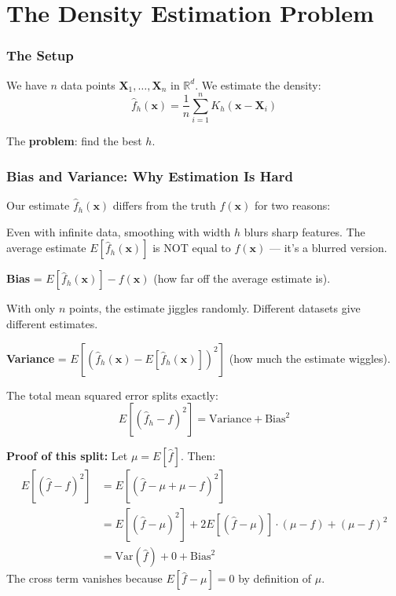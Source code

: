 \documentclass[12pt]{article}
\newcommand{\concept}[2]{\begin{tcolorbox}[colback=blue!3,colframe=blue!40!black,title={#1},breakable]#2\end{tcolorbox}}
\newcommand{\mathnote}[1]{\begin{tcolorbox}[colback=yellow!5,colframe=yellow!60!black,breakable]#1\end{tcolorbox}}
\begin{document}
\part{The Density Estimation Problem}

\section{The Setup}

We have $n$ data points $\mathbf{X}_1, \ldots, \mathbf{X}_n$ in $\mathbb{R}^d$. We estimate the density:
$$\hat{f}_h(\mathbf{x}) = \frac{1}{n}\sum_{i=1}^n K_h(\mathbf{x} - \mathbf{X}_i)$$

The \textbf{problem}: find the best $h$.

\section{Bias and Variance: Why Estimation Is Hard}

Our estimate $\hat{f}_h(\mathbf{x})$ differs from the truth $f(\mathbf{x})$ for two reasons:

\concept{Bias = systematic distortion from smoothing}{
Even with infinite data, smoothing with width $h$ blurs sharp features. The average estimate $E[\hat{f}_h(\mathbf{x})]$ is NOT equal to $f(\mathbf{x})$ --- it's a blurred version.

\textbf{Bias} = $E[\hat{f}_h(\mathbf{x})] - f(\mathbf{x})$ (how far off the average estimate is).
}

\concept{Variance = random fluctuation from having finite data}{
With only $n$ points, the estimate jiggles randomly. Different datasets give different estimates.

\textbf{Variance} = $E[(\hat{f}_h(\mathbf{x}) - E[\hat{f}_h(\mathbf{x})])^2]$ (how much the estimate wiggles).
}

The total mean squared error splits exactly:
$$E[(\hat{f}_h - f)^2] = \text{Variance} + \text{Bias}^2$$

\mathnote{
\textbf{Proof of this split:} Let $\mu = E[\hat{f}]$. Then:
\begin{align*}
E[(\hat{f} - f)^2] &= E[(\hat{f} - \mu + \mu - f)^2]\\
&= E[(\hat{f}-\mu)^2] + 2E[(\hat{f}-\mu)]\cdot(\mu-f) + (\mu-f)^2\\
&= \text{Var}(\hat{f}) + 0 + \text{Bias}^2
\end{align*}
The cross term vanishes because $E[\hat{f}-\mu] = 0$ by definition of $\mu$.
}
\end{document}
